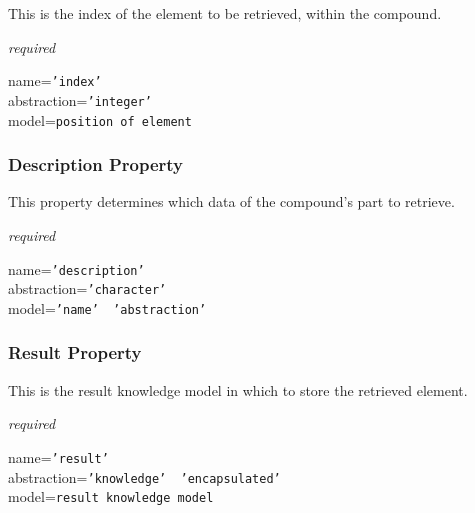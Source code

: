 This is the index of the element to be retrieved, within the compound.

\emph{required}

name=\texttt{'index'}\\
abstraction=\texttt{'integer'}\\
model=\texttt{position of element}

\subsubsection{Description Property}

This property determines which data of the compound's part to retrieve.

\emph{required}

name=\texttt{'description'}\\
abstraction=\texttt{'character'}\\
model=\texttt{'name' \vline\ 'abstraction'}

\subsubsection{Result Property}

This is the result knowledge model in which to store the retrieved element.

\emph{required}

name=\texttt{'result'}\\
abstraction=\texttt{'knowledge' \vline\ 'encapsulated'}\\
model=\texttt{result knowledge model}
